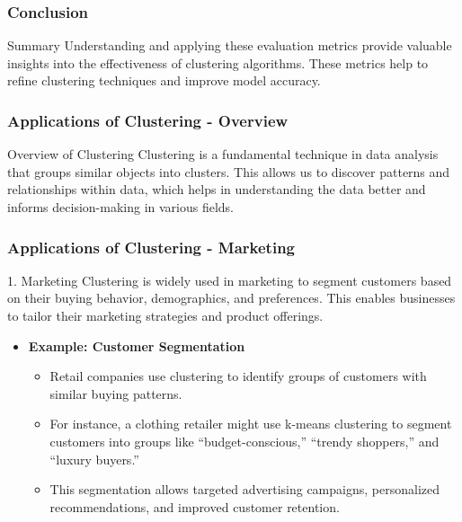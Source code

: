 \documentclass[aspectratio=169]{beamer}
\begin{document}
\begin{frame}[fragile]
    \frametitle{Conclusion}
    \begin{block}{Summary}
        Understanding and applying these evaluation metrics provide valuable insights into the effectiveness of clustering algorithms. These metrics help to refine clustering techniques and improve model accuracy.
    \end{block}
\end{frame}

\begin{frame}[fragile]
    \frametitle{Applications of Clustering - Overview}
    \begin{block}{Overview of Clustering}
        Clustering is a fundamental technique in data analysis that groups similar objects into clusters. This allows us to discover patterns and relationships within data, which helps in understanding the data better and informs decision-making in various fields.
    \end{block}
\end{frame}

\begin{frame}[fragile]
    \frametitle{Applications of Clustering - Marketing}
    \begin{block}{1. Marketing}
        Clustering is widely used in marketing to segment customers based on their buying behavior, demographics, and preferences. This enables businesses to tailor their marketing strategies and product offerings.
    \end{block}
    
    \begin{itemize}
        \item \textbf{Example: Customer Segmentation}
        \begin{itemize}
            \item Retail companies use clustering to identify groups of customers with similar buying patterns.
            \item For instance, a clothing retailer might use k-means clustering to segment customers into groups like ``budget-conscious,'' ``trendy shoppers,'' and ``luxury buyers.''
            \item This segmentation allows targeted advertising campaigns, personalized recommendations, and improved customer retention.
        \end{itemize}
    \end{itemize}
\end{frame}
\end{document}
